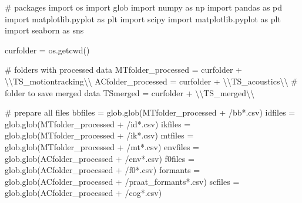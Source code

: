 \documentclass[
  letterpaper,
  DIV=11,
  numbers=noendperiod]{scrreprt}
\newenvironment{Shaded}{\begin{snugshade}}{\end{snugshade}}
\newcommand{\CharTok}[1]{\textcolor[rgb]{0.13,0.47,0.30}{#1}}
\newcommand{\CommentTok}[1]{\textcolor[rgb]{0.37,0.37,0.37}{#1}}
\newcommand{\ImportTok}[1]{\textcolor[rgb]{0.00,0.46,0.62}{#1}}
\newcommand{\NormalTok}[1]{\textcolor[rgb]{0.00,0.23,0.31}{#1}}
\newcommand{\OperatorTok}[1]{\textcolor[rgb]{0.37,0.37,0.37}{#1}}
\newcommand{\StringTok}[1]{\textcolor[rgb]{0.13,0.47,0.30}{#1}}
\begin{document}
\begin{Shaded}
\begin{Highlighting}[]
\CommentTok{\# packages}
\ImportTok{import}\NormalTok{ os}
\ImportTok{import}\NormalTok{ glob}
\ImportTok{import}\NormalTok{ numpy }\ImportTok{as}\NormalTok{ np}
\ImportTok{import}\NormalTok{ pandas }\ImportTok{as}\NormalTok{ pd}
\ImportTok{import}\NormalTok{ matplotlib.pyplot }\ImportTok{as}\NormalTok{ plt}
\ImportTok{import}\NormalTok{ scipy}
\ImportTok{import}\NormalTok{ matplotlib.pyplot }\ImportTok{as}\NormalTok{ plt}
\ImportTok{import}\NormalTok{ seaborn }\ImportTok{as}\NormalTok{ sns}

\NormalTok{curfolder }\OperatorTok{=}\NormalTok{ os.getcwd()}

\CommentTok{\# folders with processed data}
\NormalTok{MTfolder\_processed }\OperatorTok{=}\NormalTok{ curfolder }\OperatorTok{+} \StringTok{\textquotesingle{}}\CharTok{\textbackslash{}\textbackslash{}}\StringTok{TS\_motiontracking}\CharTok{\textbackslash{}\textbackslash{}}\StringTok{\textquotesingle{}}
\NormalTok{ACfolder\_processed }\OperatorTok{=}\NormalTok{ curfolder }\OperatorTok{+} \StringTok{\textquotesingle{}}\CharTok{\textbackslash{}\textbackslash{}}\StringTok{TS\_acoustics}\CharTok{\textbackslash{}\textbackslash{}}\StringTok{\textquotesingle{}}
\CommentTok{\# folder to save merged data}
\NormalTok{TSmerged }\OperatorTok{=}\NormalTok{ curfolder }\OperatorTok{+} \StringTok{\textquotesingle{}}\CharTok{\textbackslash{}\textbackslash{}}\StringTok{TS\_merged}\CharTok{\textbackslash{}\textbackslash{}}\StringTok{\textquotesingle{}}

\CommentTok{\# prepare all files}
\NormalTok{bbfiles }\OperatorTok{=}\NormalTok{ glob.glob(MTfolder\_processed }\OperatorTok{+} \StringTok{\textquotesingle{}/bb*.csv\textquotesingle{}}\NormalTok{)}
\NormalTok{idfiles }\OperatorTok{=}\NormalTok{ glob.glob(MTfolder\_processed }\OperatorTok{+} \StringTok{\textquotesingle{}/id*.csv\textquotesingle{}}\NormalTok{)}
\NormalTok{ikfiles }\OperatorTok{=}\NormalTok{ glob.glob(MTfolder\_processed }\OperatorTok{+} \StringTok{\textquotesingle{}/ik*.csv\textquotesingle{}}\NormalTok{)}
\NormalTok{mtfiles }\OperatorTok{=}\NormalTok{ glob.glob(MTfolder\_processed }\OperatorTok{+} \StringTok{\textquotesingle{}/mt*.csv\textquotesingle{}}\NormalTok{)}
\NormalTok{envfiles }\OperatorTok{=}\NormalTok{ glob.glob(ACfolder\_processed }\OperatorTok{+} \StringTok{\textquotesingle{}/env*.csv\textquotesingle{}}\NormalTok{)}
\NormalTok{f0files }\OperatorTok{=}\NormalTok{ glob.glob(ACfolder\_processed }\OperatorTok{+} \StringTok{\textquotesingle{}/f0*.csv\textquotesingle{}}\NormalTok{)}
\NormalTok{formants }\OperatorTok{=}\NormalTok{ glob.glob(ACfolder\_processed }\OperatorTok{+} \StringTok{\textquotesingle{}/praat\_formants*.csv\textquotesingle{}}\NormalTok{)}
\NormalTok{scfiles }\OperatorTok{=}\NormalTok{ glob.glob(ACfolder\_processed }\OperatorTok{+} \StringTok{\textquotesingle{}/cog*.csv\textquotesingle{}}\NormalTok{)}
\end{Highlighting}
\end{Shaded}
\end{document}
